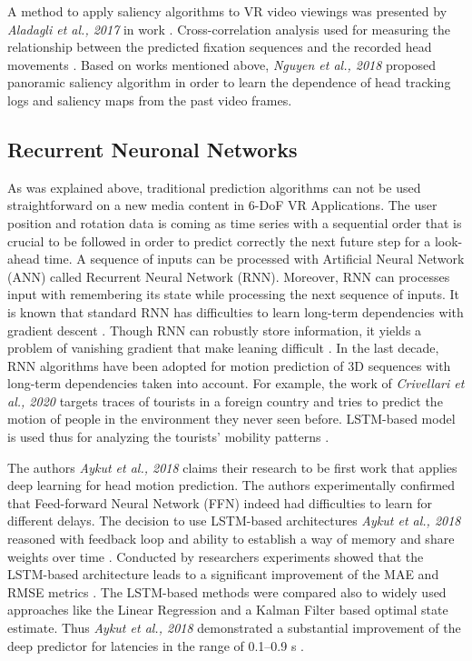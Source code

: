 A method to apply saliency algorithms to VR video viewings was presented by \textit{Aladagli et al., 2017} in work \cite{predicting_360}. Cross-correlation analysis used for measuring the relationship between the predicted fixation sequences and the recorded head movements \cite{predicting_360}. Based on works mentioned above, \textit{Nguyen et al., 2018} proposed panoramic saliency algorithm in order to learn the dependence of head tracking logs and saliency maps from the past video frames.

\subsection{Recurrent Neuronal Networks}
\label{sec:related:deep}
As was explained above, traditional prediction algorithms can not be used straightforward on a new media content in 6-DoF VR Applications. The user position and rotation data is coming as time series with a sequential order that is crucial to be followed in order to predict correctly the next future step for a look-ahead time. A sequence of inputs can be processed with Artificial Neural Network (ANN) called Recurrent Neural Network (RNN). Moreover, RNN can processes input with remembering its state while processing the next sequence of inputs. It is known that standard RNN has difficulties to learn long-term dependencies with gradient descent \cite{rnn_difficults}. Though RNN can robustly store information, it yields a problem of vanishing gradient that make leaning difficult \cite{rnn_difficults}. In the last decade, RNN algorithms have been adopted for motion prediction of 3D sequences with long-term dependencies taken into account. For example, the work of \textit{Crivellari et al., 2020} targets traces of tourists in a foreign country and tries to predict the motion of people in the environment they never seen before. LSTM-based model is used thus for analyzing the tourists’ mobility patterns \cite{tourist_traces}.

The authors \textit{Aykut et al., 2018} claims their research to be first work that applies deep learning for head motion prediction. The authors experimentally confirmed that Feed-forward Neural Network (FFN) indeed had difficulties to learn for different delays. The decision to use LSTM-based architectures \textit{Aykut et al., 2018} reasoned with feedback loop and ability to establish a way of memory and share weights over time \cite{delay_compensation_360}. Conducted by researchers experiments showed that the LSTM-based architecture leads to a significant improvement of the MAE and RMSE metrics \cite{delay_compensation_360}. The LSTM-based methods were compared also to widely used approaches like the Linear Regression and a Kalman Filter based optimal state estimate. Thus \textit{Aykut et al., 2018} demonstrated a substantial improvement of the deep predictor for latencies in the range of 0.1–0.9 s \cite{delay_compensation_360}.

